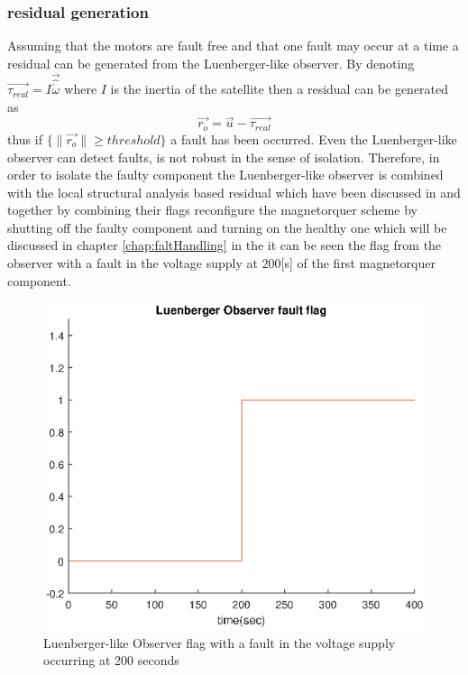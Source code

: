 \subsubsection{residual generation}
 \label{sec:simpleObserveresidual}
 Assuming that the motors are fault free and that one fault may occur at a time a residual can be generated from the Luenberger-like observer. By denoting $\vec{\tau_{real}} =I\vec{\hat{{\dot \omega}}}$ where $I$ is the inertia of the satellite then a residual can be generated as
 \begin{equation}
 \vec{r_{o}} = \vec{u} - \vec{\tau_{real}}
 \label{eq:residualObs}
 \end{equation}
 thus if $\{\lVert \vec{r_{o}}\rVert \geq threshold \}$ a fault has been occurred. Even the Luenberger-like observer can detect faults, is not robust in the sense of isolation. Therefore, in order to isolate the faulty component the  Luenberger-like observer is combined with the local structural analysis based residual which have been discussed in  and together by combining their flags reconfigure the magnetorquer scheme by shutting off the faulty component and turning on the healthy one which will be discussed in chapter \ref{chap:faltHandling} in the  it can be seen the flag from the observer with a fault in the voltage supply at $200$[s] of the first magnetorquer component. 
 \begin{figure}[H]
 	\centering
 	\includegraphics[width=0.9\linewidth]{figures/Luenberger_Observerflag}
 	\caption{Luenberger-like Observer flag with a fault in the voltage supply occurring at 200 seconds   }
 	\label{fig:obsflag}
 \end{figure}